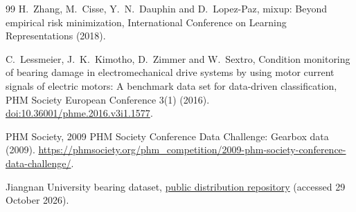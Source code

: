 \begin{thebibliography}{99}
H.~Zhang, M.~Cisse, Y.~N.~Dauphin and D.~Lopez-Paz,
mixup: Beyond empirical risk minimization,
International Conference on Learning Representations (2018).

C.~Lessmeier, J.~K.~Kimotho, D.~Zimmer and W.~Sextro,
Condition monitoring of bearing damage in electromechanical drive systems by
using motor current signals of electric motors: A benchmark data set for
data-driven classification,
PHM Society European Conference 3(1) (2016).
\href{https://doi.org/10.36001/phme.2016.v3i1.1577}{doi:10.36001/phme.2016.v3i1.1577}.

PHM Society, 2009 PHM Society Conference Data Challenge: Gearbox data (2009).
\url{https://phmsociety.org/phm_competition/2009-phm-society-conference-data-challenge/}.

Jiangnan University bearing dataset,
\href{https://github.com/ClarkGableWang/JNU-Bearing-Dataset}{public distribution repository}
(accessed 29 October 2026).
\end{thebibliography}
